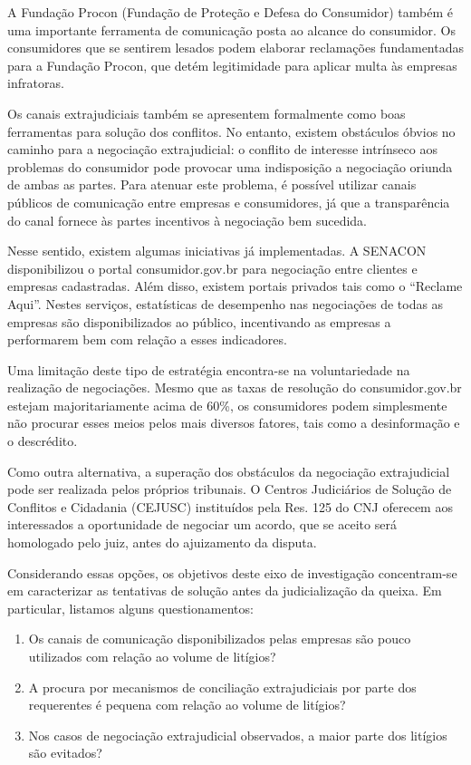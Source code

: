 \documentclass[]{report}
\providecommand{\tightlist}{%
  \setlength{\itemsep}{0pt}\setlength{\parskip}{0pt}}
\begin{document}
A Fundação Procon (Fundação de Proteção e Defesa do Consumidor) também é
uma importante ferramenta de comunicação posta ao alcance do consumidor.
Os consumidores que se sentirem lesados podem elaborar reclamações
fundamentadas para a Fundação Procon, que detém legitimidade para
aplicar multa às empresas infratoras.

Os canais extrajudiciais também se apresentem formalmente como boas
ferramentas para solução dos conflitos. No entanto, existem obstáculos
óbvios no caminho para a negociação extrajudicial: o conflito de
interesse intrínseco aos problemas do consumidor pode provocar uma
indisposição a negociação oriunda de ambas as partes. Para atenuar este
problema, é possível utilizar canais públicos de comunicação entre
empresas e consumidores, já que a transparência do canal fornece às
partes incentivos à negociação bem sucedida.

Nesse sentido, existem algumas iniciativas já implementadas. A SENACON
disponibilizou o portal consumidor.gov.br para negociação entre clientes
e empresas cadastradas. Além disso, existem portais privados tais como o
``Reclame Aqui''. Nestes serviços, estatísticas de desempenho nas
negociações de todas as empresas são disponibilizados ao público,
incentivando as empresas a performarem bem com relação a esses
indicadores.

Uma limitação deste tipo de estratégia encontra-se na voluntariedade na
realização de negociações. Mesmo que as taxas de resolução do
consumidor.gov.br estejam majoritariamente acima de 60\%, os
consumidores podem simplesmente não procurar esses meios pelos mais
diversos fatores, tais como a desinformação e o descrédito.

Como outra alternativa, a superação dos obstáculos da negociação
extrajudicial pode ser realizada pelos próprios tribunais. O Centros
Judiciários de Solução de Conflitos e Cidadania (CEJUSC) instituídos
pela Res. 125 do CNJ oferecem aos interessados a oportunidade de
negociar um acordo, que se aceito será homologado pelo juiz, antes do
ajuizamento da disputa.

Considerando essas opções, os objetivos deste eixo de investigação
concentram-se em caracterizar as tentativas de solução antes da
judicialização da queixa. Em particular, listamos alguns
questionamentos:

\begin{enumerate}
\def\labelenumi{\arabic{enumi}.}
\tightlist
\item
  Os canais de comunicação disponibilizados pelas empresas são pouco
  utilizados com relação ao volume de litígios?
\item
  A procura por mecanismos de conciliação extrajudiciais por parte dos
  requerentes é pequena com relação ao volume de litígios?
\item
  Nos casos de negociação extrajudicial observados, a maior parte dos
  litígios são evitados?
\end{enumerate}
\end{document}
